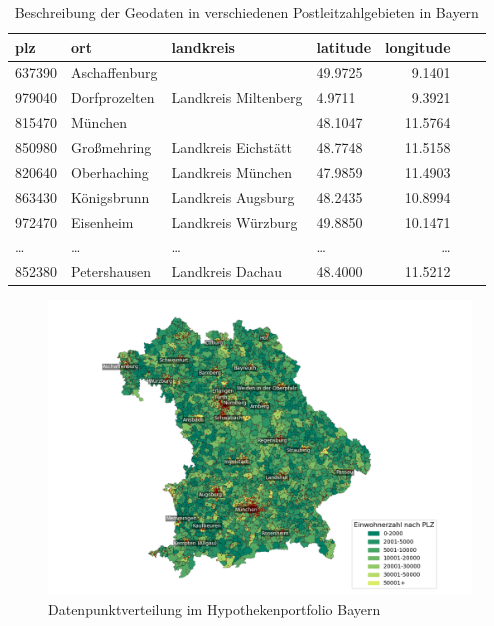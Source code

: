 \begin{table}[htbp]
    \centering
    \small  %
    \caption{Beschreibung der Geodaten in verschiedenen Postleitzahlgebieten in Bayern}
    \label{tab:geodatenhyp}
    \begin{tabularx}{\textwidth}{lXlXrXr}
        \toprule
        \textbf{plz} & \textbf{ort} & \textbf{landkreis} & \textbf{latitude} & \textbf{longitude} \\
        \midrule
        637390 & Aschaffenburg & & 49.9725 & 9.1401 \\
        979040 & Dorfprozelten & Landkreis Miltenberg & 4.9711 & 9.3921 \\
        815470 & München & & 48.1047 & 11.5764 \\
        850980 & Großmehring & Landkreis Eichstätt & 48.7748 & 11.5158\\
        820640 & Oberhaching & Landkreis München & 47.9859 & 11.4903 \\
        863430 & Königsbrunn & Landkreis Augsburg & 48.2435 & 10.8994 \\
        972470 & Eisenheim & Landkreis Würzburg & 49.8850 & 10.1471 \\
        \dots & \dots & \dots & \dots & \dots \\
        852380 & Petershausen & Landkreis Dachau & 48.4000 & 11.5212\\
        \bottomrule
    \end{tabularx}
\end{table} 
\clearpage 

\begin{figure}[htbp]
    \centering
    \includegraphics[width=\textwidth]{figures/bayern_por_pop.png} 
    \caption{Datenpunktverteilung im Hypothekenportfolio Bayern}
    \label{fig:hypothekenportfolio}
\end{figure}

